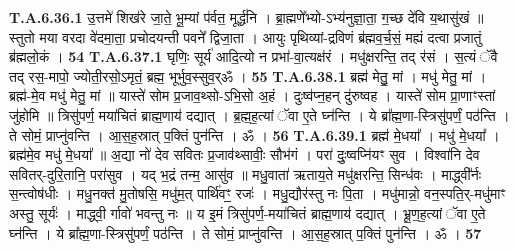\documentclass[17pt]{extarticle}
\begin{document}
                  \newline
                                                         \textbf{} \newline \newline
                                \textbf{ T.A.6.36.1} \newline
                  उ॒त्तमे॑ शिख॑रे जा॒ते॒ भू॒म्यां प॑र्वत॒ मूर्द्ध॑नि ।  ब्रा॒ह्मणे᳚भ्यो-ऽभ्य॑नुज्ञा॒ता॒ ग॒च्छ दे॑वि य॒थासु॑खं ॥ स्तुतो मया वरदा वे॑दमा॒ता॒ प्रचोदयन्ती पवने᳚ द्विजा॒ता । आयुः पृथिव्यां-द्रविणं ब्र॑ह्मव॒र्च॒सं॒ मह्यं दत्वा प्रजातुं  ब्र॑ह्मलो॒कं । \textbf{ 54} \newline
                  \newline
                                                         \textbf{} \newline \newline
                                \textbf{ T.A.6.37.1} \newline
                  घृणिः॒ सूर्य॑ आदि॒त्यो न प्रभा॑-वा॒त्यक्ष॑रं । मधु॑क्षरन्ति॒ तद् र॑सं । स॒त्यं ॅवै तद् रस॒-मापो॒ ज्योती॒रसो॒ऽमृतं॒ ब्रह्म॒  भूर्भुव॒स्सुव॒र्ॐ । \textbf{ 55} \newline
                  \newline
                                                         \textbf{} \newline \newline
                                \textbf{ T.A.6.38.1} \newline
                  ब्रह्म॑ मेतु॒॒ मां । मधु॑ मेतु॒ मां । ब्रह्म॑-मे॒व मधु॑ मेतु॒ मां ॥ यास्ते॑ सोम प्र॒जाव॒थ्सो-ऽभि॒सो अ॒हं । दुःष्व॑प्न॒हन् दु॑रुष्वह ।  यास्ते॑ सोम प्रा॒णाꣳस्तां जु॑होमि ॥  त्रिसु॑पर्ण॒ मया॑चितं ब्राह्म॒णाय॑ दद्यात् । ब्र॒ह्म॒ह॒त्यां ॅवा ए॒ते घ्न॑न्ति ।  ये ब्रा᳚ह्म॒णा-स्त्रिसु॑पर्णं॒ पठ॑न्ति । ते सोमं॒ प्राप्नु॑वन्ति । आ॒स॒ह॒स्रात् प॒क्तिं पुन॑न्ति । ॐ । \textbf{ 56} \newline
                  \newline
                                                         \textbf{} \newline \newline
                                \textbf{ T.A.6.39.1} \newline
                  ब्रह्म॑ मे॒धया᳚ । मधु॑ मे॒धया᳚ । ब्रह्म॑मे॒व मधु॑ मे॒धया᳚ ॥ अ॒द्या नो॑ देव सवितः प्र॒जाव॑थ्सावीः॒ सौभ॑गं । परा॑ दुः॒ष्वप्नि॑यꣳ सुव । विश्वा॑नि देव सवितर्-दुरि॒तानि॒ परा॑सुव । यद् भ॒द्रं तन्म॒ आसु॑व ॥ मधु॒वाता॑ ऋताय॒ते मधु॑क्षरन्ति॒ सिन्ध॑वः । माद्ध्वी᳚र्नः स॒न्त्वोष॑धीः । मधु॒नक्त॑ मु॒तोषसि॒ मधु॑म॒त् पार्थि॑वꣳ॒॒ रजः॑ । मधु॒द्यौर॑स्तु नः पि॒ता । मधु॑मान्नो॒ वन॒स्पति॒र्-मधु॑माꣳ अस्तु॒ सूर्यः॑ ।  माद्ध्वी॒ र्गावो॑ भवन्तु नः ॥  य इ॒मं त्रिसु॑पर्ण॒-मया॑चितं ब्राह्म॒णाय॑ दद्यात् ।  भ्रू॒ण॒ह॒त्यां ॅवा ए॒ते घ्न॑न्ति । ये ब्रा᳚ह्म॒णा-स्त्रिसु॑पर्णं॒ पठ॑न्ति । ते सोमं॒ प्राप्नु॑वन्ति । आ॒स॒ह॒स्रात् प॒क्तिं पुन॑न्ति । ॐ । \textbf{ 57} \newline
\end{document}
